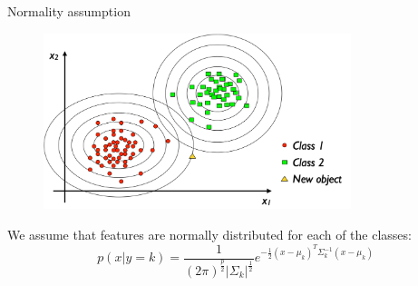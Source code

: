 \documentclass[xcolor=pdftex,dvipsnames,table]{beamer}
\begin{document}




\begin{frame}{Normality assumption}
\begin{figure}[htb]
\includegraphics[width=0.8\textwidth]{../graphics/LDA3.pdf}
\end{figure}
We assume that features are normally distributed for each of the classes:
\begin{equation}\label{equ:lda:normal}
p(x|y=k)=\frac{1}{(2\pi)^{\frac{p}{2}}|\Sigma_k|^{\frac{1}{2}}}e^{-\frac{1}{2}(x-\mu_k)^T\Sigma_k^{-1}(x-\mu_k)}
\end{equation}
\end{frame}
\end{document}
